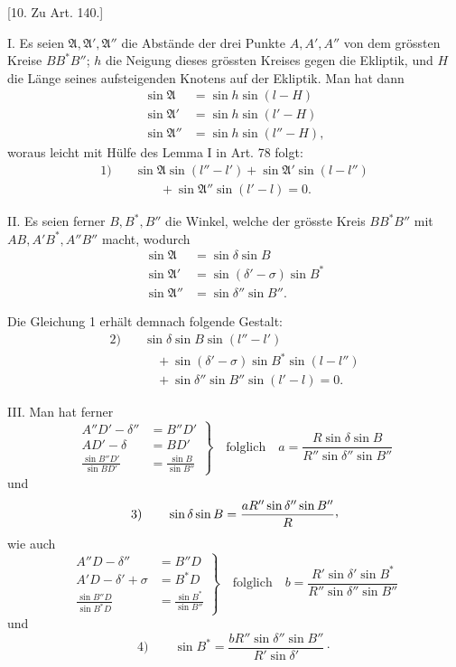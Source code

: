 \begin{center}
[10. Zu Art. 140.]
\end{center}
I. Es seien \(\mathfrak{A},\mathfrak{A}',\mathfrak{A}''\) die Abstände der drei Punkte \(A,A',A''\) von dem grössten Kreise \(BB^*B''\); \(h\) die Neigung dieses grössten Kreises gegen die Ekliptik, und \(H\) die Länge seines aufsteigenden Knotens auf der Ekliptik. Man hat dann
\[
\begin{aligned}
\sin\mathfrak{A}&=\sin h\sin(l-H)\\
\sin\mathfrak{A}'&=\sin h\sin(l'-H)\\
\sin\mathfrak{A}''&=\sin h\sin(l''-H),
\end{aligned}
\]
woraus leicht mit Hülfe des Lemma I in Art. 78 folgt:
\[
\begin{aligned}
1)\quad &\sin\mathfrak{A}\sin(l''-l')+\sin\mathfrak{A}'\sin(l-l'')\\
&\qquad+\sin\mathfrak{A}''\sin(l'-l)=0.
\end{aligned}
\]

II. Es seien ferner \(B,B^*,B''\) die Winkel, welche der grösste Kreis \(BB^*B''\) mit \(AB,A'B^*,A''B''\) macht, wodurch
\[
\begin{aligned}
\sin\mathfrak{A}&=\sin\delta\sin B\\
\sin\mathfrak{A}'&=\sin(\delta'-\sigma)\sin B^*\\
\sin\mathfrak{A}''&=\sin\delta''\sin B''.
\end{aligned}
\]

Die Gleichung 1 erhält demnach folgende Gestalt:
\[
\begin{aligned}
2)\quad &\sin\delta\sin B\sin(l''-l')\\
&\quad+\sin(\delta'-\sigma)\sin B^*\sin(l-l'')\\
&\quad+\sin\delta''\sin B''\sin(l'-l)=0.
\end{aligned}
\]

III. Man hat ferner
\[
\left.\begin{aligned}
A''D'-\delta''&=B''D'\\
AD'-\delta&=BD'\\
\frac{\sin B''D'}{\sin BD'}&=\frac{\sin B}{\sin B''}
\end{aligned}\right\}
\quad\text{folglich}\quad a=\frac{R\sin\delta\sin B}{R''\sin\delta''\sin B''}
\]
und
\[
3)\qquad \sin\delta\sin B=\frac{aR''\sin\delta''\sin B''}{R}\mathpunct{\raisebox{.45ex}{,}}
\]
wie auch
\[
\left.\begin{aligned}
A''D-\delta''&=B''D\\
A'D-\delta'+\sigma&=B^*D\\
\frac{\sin B''D}{\sin B^*D}&=\frac{\sin B^*}{\sin B''}
\end{aligned}\right\}
\quad\text{folglich}\quad b=\frac{R'\sin\delta'\sin B^*}{R''\sin\delta''\sin B''}
\]
und
\[
4)\qquad \sin B^*=\frac{bR''\sin\delta''\sin B''}{R'\sin\delta'}\mathpunct{\cdot}
\]

